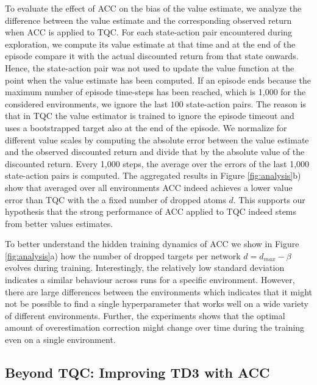 To evaluate the effect of ACC on the bias of the value estimate, we analyze the difference between the value estimate and the corresponding observed return when ACC is applied to TQC.
For each state-action pair encountered during exploration, we compute its value estimate at that time and at the end of the episode compare it  with the actual discounted return from that state onwards. Hence, the state-action pair was not used to update the value function at the point when the value estimate has been computed.
If an episode ends because the maximum number of episode time-steps has been reached, which is 1,000 for the considered environments, we ignore the last $100$ state-action pairs. The reason is that in TQC the value estimator is trained to ignore the episode timeout and uses a bootstrapped target also at the end of the episode. 
We normalize for different value scales by computing the absolute error between the value estimate and the observed discounted return and divide that by the absolute value of the discounted return.
Every 1,000 steps, the average over the errors of the last 1,000 state-action pairs is computed.
The aggregated results in Figure 
\ref{fig:analysis}b)
show that averaged over all environments ACC indeed achieves a lower value error than TQC with the a fixed number of dropped atoms $d$.
This supports our hypothesis that the strong performance of ACC applied to TQC indeed stems from better values estimates.



To better understand the hidden training dynamics of ACC we show in Figure
\ref{fig:analysis}a)
how the number of dropped targets per network $d = d_{max} - \beta$ evolves during training.
Interestingly, the relatively low standard deviation indicates a similar behaviour across runs for a specific environment.
However, there are large differences between the environments which indicates that it might not be possible to find a single hyperparameter that works well on a wide variety of different environments.
Further, the experiments shows that the optimal amount of overestimation correction might change over time during the training even on a single environment.

\subsection{Beyond TQC: Improving TD3 with ACC}

